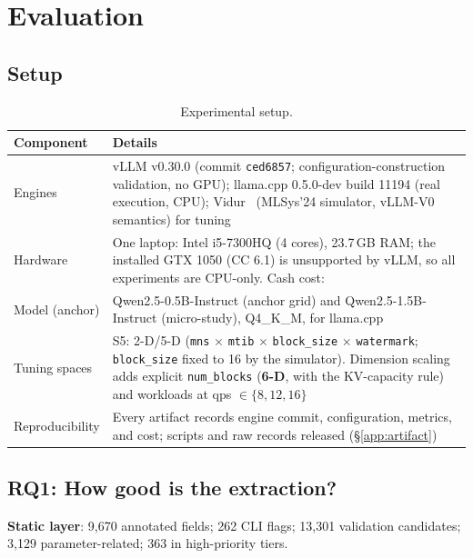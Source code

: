 \documentclass[journal]{IEEEtran}
\newcommand{\code}[1]{\texttt{#1}}
\begin{document}
\section{Evaluation}

\subsection{Setup}
\label{sec:setup}

\begin{table}[t]
\centering
\caption{Experimental setup.}
\label{tab:setup}
\small
\begin{tabular}{@{}>{\raggedright\arraybackslash}p{2.3cm}>{\raggedright\arraybackslash}p{5.1cm}@{}}
\toprule
Component & Details \\
\midrule
Engines & vLLM v0.30.0 (commit \code{ced6857}; configuration-construction validation, no GPU); llama.cpp 0.5.0-dev build 11194 (real execution, CPU); Vidur~\cite{ref6} (MLSys'24 simulator, vLLM-V0 semantics) for tuning \\
Hardware & One laptop: Intel i5-7300HQ (4 cores), 23.7\,GB RAM; the installed GTX 1050 (CC 6.1) is unsupported by vLLM, so all experiments are CPU-only. Cash cost: \textyen 0 \\
Model (anchor) & Qwen2.5-0.5B-Instruct (anchor grid) and Qwen2.5-1.5B-Instruct (micro-study), Q4\_K\_M, for llama.cpp \\
Tuning spaces & S5: 2-D/5-D (\code{mns} $\times$ \code{mtib} $\times$ \code{block\_size} $\times$ \code{watermark}; \code{block\_size} fixed to 16 by the simulator). Dimension scaling adds explicit \code{num\_blocks} (\textbf{6-D}, with the KV-capacity rule) and workloads at qps $\in \{8,12,16\}$ \\
Reproducibility & Every artifact records engine commit, configuration, metrics, and cost; scripts and raw records released (\S\ref{app:artifact}) \\
\bottomrule
\end{tabular}
\end{table}

\subsection{RQ1: How good is the extraction?}
\label{sec:rq1}

\textbf{Static layer}: 9{,}670 annotated fields; 262 CLI flags; 13{,}301 validation candidates; 3{,}129 parameter-related; 363 in high-priority tiers.
\end{document}
